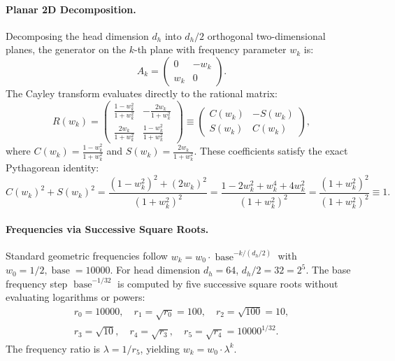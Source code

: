 \documentclass[11pt,a4paper]{article}
\theoremstyle{definition}
\begin{document}
\paragraph{Planar 2D Decomposition.}
Decomposing the head dimension $d_h$ into $d_h/2$ orthogonal two-dimensional planes, the generator on the $k$-th plane with frequency parameter $w_k$ is:
\begin{equation}
A_k = \begin{pmatrix} 0 & -w_k \\ w_k & 0 \end{pmatrix}.
\end{equation}
The Cayley transform evaluates directly to the rational matrix:
\begin{equation}
R(w_k) = \begin{pmatrix} \frac{1 - w_k^2}{1 + w_k^2} & -\frac{2 w_k}{1 + w_k^2} \\ \frac{2 w_k}{1 + w_k^2} & \frac{1 - w_k^2}{1 + w_k^2} \end{pmatrix} \equiv \begin{pmatrix} C(w_k) & -S(w_k) \\ S(w_k) & C(w_k) \end{pmatrix},
\end{equation}
where $C(w_k) = \frac{1 - w_k^2}{1 + w_k^2}$ and $S(w_k) = \frac{2 w_k}{1 + w_k^2}$. These coefficients satisfy the exact Pythagorean identity:
\begin{equation}
C(w_k)^2 + S(w_k)^2 = \frac{(1 - w_k^2)^2 + (2 w_k)^2}{(1 + w_k^2)^2} = \frac{1 - 2w_k^2 + w_k^4 + 4w_k^2}{(1 + w_k^2)^2} = \frac{(1 + w_k^2)^2}{(1 + w_k^2)^2} \equiv 1.
\end{equation}

\paragraph{Frequencies via Successive Square Roots.}
Standard geometric frequencies follow $w_k = w_0 \cdot \operatorname{base}^{-k/(d_h/2)}$ with $w_0 = 1/2, \operatorname{base} = 10000$. For head dimension $d_h = 64$, $d_h/2 = 32 = 2^5$. The base frequency step $\operatorname{base}^{-1/32}$ is computed by five successive square roots without evaluating logarithms or powers:
\begin{align}
r_0 = 10000, \quad r_1 = \sqrt{r_0} = 100, \quad r_2 = \sqrt{100} = 10, \nonumber \\
r_3 = \sqrt{10}, \quad r_4 = \sqrt{r_3}, \quad r_5 = \sqrt{r_4} = 10000^{1/32}.
\end{align}
The frequency ratio is $\lambda = 1 / r_5$, yielding $w_k = w_0 \cdot \lambda^k$.
\end{document}
